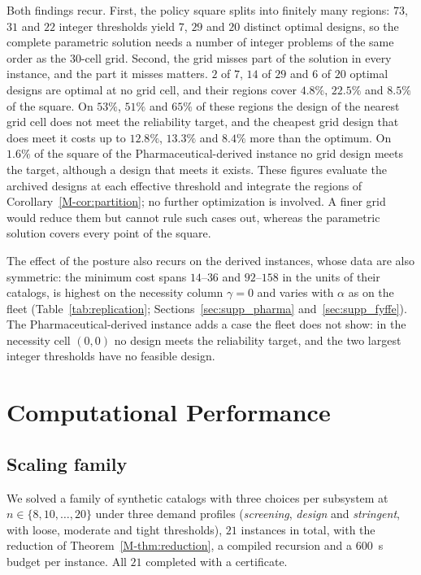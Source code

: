 \documentclass[11pt]{article}
\begin{document}


Both findings recur. First, the policy square splits into finitely many regions: $73$, $31$ and $22$ integer thresholds yield $7$, $29$ and $20$ distinct optimal designs, so the complete parametric solution needs a number of integer problems of the same order as the $30$-cell grid. Second, the grid misses part of the solution in every instance, and the part it misses matters. $2$ of $7$, $14$ of $29$ and $6$ of $20$ optimal designs are optimal at no grid cell, and their regions cover $4.8\%$, $22.5\%$ and $8.5\%$ of the square. On $53\%$, $51\%$ and $65\%$ of these regions the design of the nearest grid cell does not meet the reliability target, and the cheapest grid design that does meet it costs up to $12.8\%$, $13.3\%$ and $8.4\%$ more than the optimum. On $1.6\%$ of the square of the Pharmaceutical-derived instance no grid design meets the target, although a design that meets it exists. These figures evaluate the archived designs at each effective threshold and integrate the regions of Corollary~\ref*{M-cor:partition}; no further optimization is involved. A finer grid would reduce them but cannot rule such cases out, whereas the parametric solution covers every point of the square.

The effect of the posture also recurs on the derived instances, whose data are also symmetric: the minimum cost spans $14$--$36$ and $92$--$158$ in the units of their catalogs, is highest on the necessity column $\gamma=0$ and varies with $\alpha$ as on the fleet (Table~\ref{tab:replication}; Sections~\ref{sec:supp_pharma} and~\ref{sec:supp_fyffe}). The Pharmaceutical-derived instance adds a case the fleet does not show: in the necessity cell $(0,0)$ no design meets the reliability target, and the two largest integer thresholds have no feasible design.

\section{Computational Performance} \label{sec:supp_scaling}

\subsection{Scaling family}
We solved a family of synthetic catalogs with three
choices per subsystem at $n \in \{8,10,\dots,20\}$ under three demand profiles (\emph{screening},
\emph{design} and \emph{stringent}, with loose, moderate and tight thresholds), $21$ instances in total,
with the reduction of Theorem~\ref*{M-thm:reduction}, a compiled recursion and a $600$~s budget per instance. All $21$
completed with a certificate.
\end{document}

